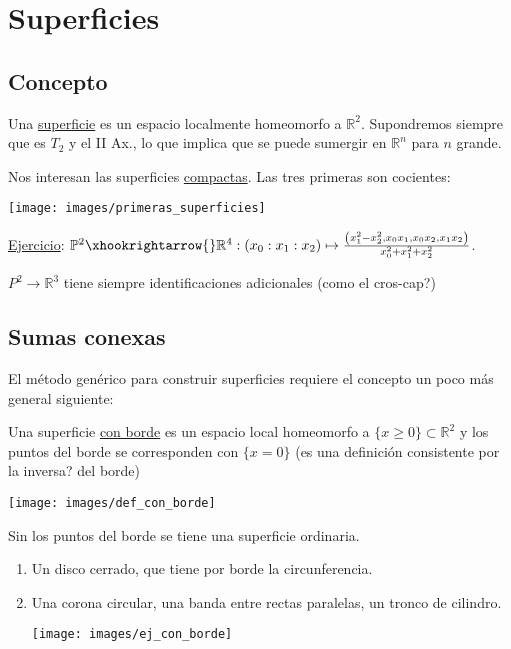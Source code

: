 \chapter{Superficies}%
\label{cha:superficies}
\section{Concepto}%
\label{sec:concepto_sup}
\begin{defi}
Una \underline{superficie} es un espacio localmente homeomorfo a $\mathbb{R}^{2}$. Supondremos siempre que es $T_2$ y el II Ax., lo que implica que se puede sumergir en $\mathbb{R}^{n}$ para $n$ grande.
\end{defi}
Nos interesan las superficies \underline{compactas}. Las tres primeras son cocientes:
\begin{center}
    \texttt{[image: images/primeras\_superficies]} 
\end{center}
\underline{Ejercicio}: $\mathbb{P}^{2} \xhookrightarrow{} \mathbb{R}^{4}: \left( x_0 : x_1 : x_2 \right) \mapsto \frac{\left( x_1^2 - x_2^2, x_0x_1, x_0x_2, x_1x_2 \right)}{x_0^2 + x_1^2 + x_2^2}$.

\begin{obs}
$P^2 \rightarrow \mathbb{R}^{3}$ tiene siempre identificaciones adicionales (como el cros-cap?)
\end{obs}

\section{Sumas conexas}%
\label{sec:sumas_conexas}
El método genérico para construir superficies requiere el concepto un poco más general siguiente:
\begin{defi}
Una superficie \underline{con borde} es un espacio local homeomorfo a $\{x \ge 0\} \subset \mathbb{R}^{2}$ y los puntos del borde se corresponden con $\{x = 0\}$ (es una definición consistente por la inversa? del borde)
\begin{center}
    \texttt{[image: images/def\_con\_borde]} 
\end{center}
\end{defi}
\begin{obs}
Sin los puntos del borde se tiene una superficie ordinaria.
\end{obs}

\begin{ej}
\begin{enumerate}
    \item Un disco cerrado, que tiene por borde la circunferencia.
    \item Una corona circular, una banda entre rectas paralelas, un tronco de cilindro. 
    \begin{center}
        \texttt{[image: images/ej\_con\_borde]} 
    \end{center}
\end{enumerate}
\end{ej}

